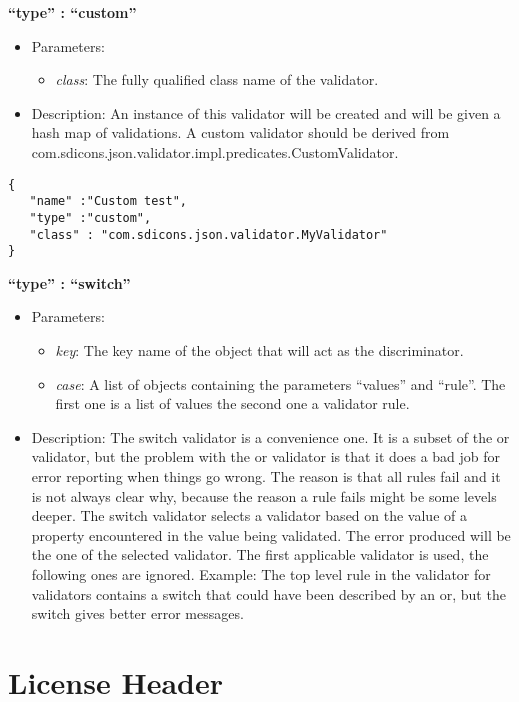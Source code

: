 \documentclass[a4paper]{article}
\newcommand{\ruledef}[3]{
\medskip
\textbf{#1}

\begin{itemize}
\setlength{\itemsep}{1pt}
\setlength{\parskip}{0pt}
\setlength{\parsep}{0pt}
   \item Parameters: #2
   \item Description: #3
\end{itemize}
}
\newcommand{\rulename}[1]{\textbf{``type'' : ``#1''}}
\newcommand{\param}[1]{\textsl{#1}:}
\begin{document}
\ruledef{\rulename{custom}}{\begin{itemize} \item \param{class} The fully qualified class name of the validator.\end{itemize}}{An instance of this validator will be created and will be given a hash map of validations.  A custom validator should be derived from com.sdicons.json.validator.impl.predicates.CustomValidator. }

\begin{lstlisting}
{
   "name" :"Custom test",
   "type" :"custom",
   "class" : "com.sdicons.json.validator.MyValidator"
}
\end{lstlisting}

\ruledef{\rulename{switch}}{\begin{itemize} \item \param{key} The key name of the object that will act as the discriminator. \item \param{case}  A list of objects containing the parameters ``values'' and ``rule''. The first one is a list of values the second one a validator rule. \end{itemize}}{ The switch validator is a convenience one. It is a subset of the or validator, but the problem with the or validator is that it does a bad job for error reporting when things go wrong. The reason is that all rules fail and it is not always clear why, because the reason a rule fails might be some levels deeper. The switch validator selects a validator based on the value of  a property encountered in the value being validated. The error produced will be the one of the selected validator.  The first applicable validator is used, the following ones are ignored.
Example: The top level rule in the validator for validators contains a switch that could have been described by an or, but the switch gives better error messages.}

\appendix

\newpage
\section{ License Header }
\label{license}
\end{document}
